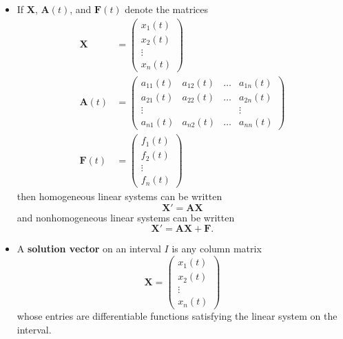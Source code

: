 \documentclass{article}
\begin{document}
\begin{itemize}
  \item If $\mathbf{X}$, $\mathbf{A}(t)$, and $\mathbf{F}(t)$ denote the matrices \begin{align*}
          \mathbf{X}    & = \begin{pmatrix}
                              x_1(t) \\
                              x_2(t) \\
                              \vdots \\
                              x_n(t)
                            \end{pmatrix}                             \\
          \mathbf{A}(t) & = \begin{pmatrix}
                              a_{11}(t) & a_{12}(t) & \ldots & a_{1n}(t) \\
                              a_{21}(t) & a_{22}(t) & \ldots & a_{2n}(t) \\
                              \vdots    &           &        & \vdots    \\
                              a_{n1}(t) & a_{n2}(t) & \ldots & a_{nn}(t)
                            \end{pmatrix} \\
          \mathbf{F}(t) & = \begin{pmatrix}
                              f_1(t) \\
                              f_2(t) \\
                              \vdots \\
                              f_n(t)
                            \end{pmatrix}
        \end{align*} then homogeneous linear systems can be written \[\mathbf{X}' = \mathbf{A} \mathbf{X}\] and nonhomogeneous linear systems can be written \[\mathbf{X}' = \mathbf{A} \mathbf{X} + \mathbf{F}.\]

  \item A \textbf{solution vector} on an interval $I$ is any column matrix \[\mathbf{X} = \begin{pmatrix}
            x_1(t) \\
            x_2(t) \\
            \vdots \\
            x_n(t)
          \end{pmatrix}\] whose entries are differentiable functions satisfying the linear system on the interval.


\end{itemize}
\end{document}
